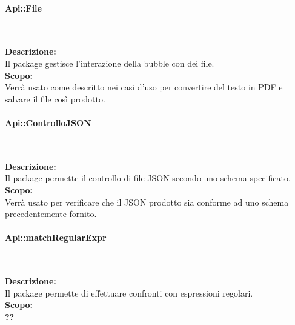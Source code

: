 \begin{samepage}
\paragraph{Api::File}\label{api-file}\mbox{}\\
\end{samepage}
\textbf{Descrizione:}\\ 
Il package gestisce l'interazione della bubble con dei file.\\ 
\textbf{Scopo:}\\
Verrà usato come descritto nei casi d'uso per convertire del testo in PDF e salvare il file così prodotto.

\begin{samepage}
\paragraph{Api::ControlloJSON}\label{api-json}\mbox{}\\
\end{samepage}
\textbf{Descrizione:}\\ 
Il package permette il controllo di file JSON secondo uno schema specificato.\\ 
\textbf{Scopo:}\\
Verrà usato per verificare che il JSON prodotto sia conforme ad uno schema precedentemente fornito.

\begin{samepage}
\paragraph{Api::matchRegularExpr}\label{api-regexpr}\mbox{}\\
\end{samepage}
\textbf{Descrizione:}\\ 
Il package permette di effettuare confronti con espressioni regolari.\\ 
\textbf{Scopo:}\\
\textbf{??}

